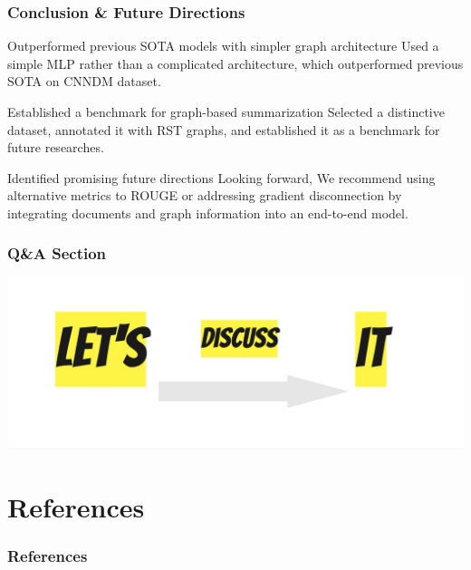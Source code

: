 \documentclass{beamer}
\begin{document}
\begin{frame}
\frametitle{Conclusion \& Future Directions}

\begin{block}{Outperformed previous SOTA models with simpler graph architecture}
Used a simple MLP rather than a complicated architecture, which outperformed previous SOTA on CNNDM dataset.
\end{block}

\begin{alertblock}{Established a benchmark for graph-based summarization}
Selected a distinctive dataset, annotated it with RST graphs, and established it as a benchmark for future researches.
\end{alertblock}

\begin{exampleblock}{Identified promising future directions}
Looking forward, We recommend using alternative metrics to ROUGE or addressing gradient disconnection by integrating documents and graph information into an end-to-end model.
\end{exampleblock}

\end{frame}


\begin{frame}
\frametitle{Q\&A Section}

   \begin{minipage}[t][0.5\textheight][t]{\textwidth}
      \centering
      \includegraphics[width=\textwidth]{imgs/discuss.jpg} 
  \end{minipage}




\end{frame}

\section{References}

\begin{frame}[allowframebreaks]
\frametitle{References}

\vspace*{-\baselineskip}
\setlength{\bibsep}{2pt}
\renewcommand*{\bibfont}{\tiny}
\renewcommand{\refname}{}


\end{frame}
\end{document}
